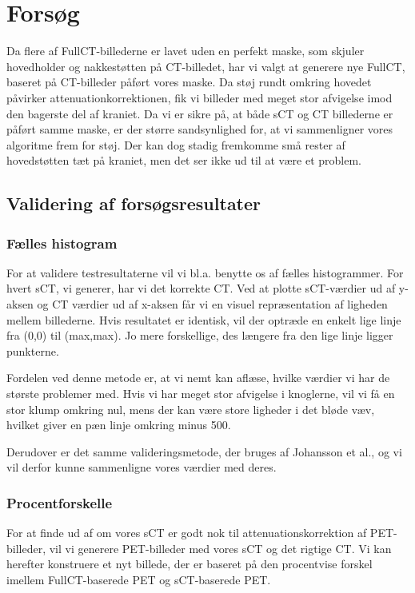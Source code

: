 \section{Forsøg}

Da flere af FullCT-billederne er lavet uden en perfekt maske, som skjuler hovedholder og nakkestøtten på CT-billedet, har vi valgt at generere nye FullCT, baseret på CT-billeder påført vores maske. Da støj rundt omkring hovedet påvirker attenuationkorrektionen, fik vi billeder med meget stor afvigelse imod den bagerste del af kraniet. Da vi er sikre på, at både sCT og CT billederne er påført samme maske, er der større sandsynlighed for, at vi sammenligner vores algoritme frem for støj. Der kan dog stadig fremkomme små rester af hovedstøtten tæt på kraniet, men det ser ikke ud til at være et problem.

\subsection{Validering af forsøgsresultater}

\subsubsection{Fælles histogram}

For at validere testresultaterne vil vi bl.a. benytte os af fælles histogrammer. For hvert sCT, vi generer, har vi det korrekte CT. Ved at plotte sCT-værdier ud af y-aksen og CT værdier ud af x-aksen får vi en visuel repræsentation af ligheden mellem billederne. Hvis resultatet er identisk, vil der optræde en enkelt lige linje fra (0,0) til (max,max). Jo mere forskellige, des længere fra den lige linje ligger punkterne.

Fordelen ved denne metode er, at vi nemt kan aflæse, hvilke værdier vi har de største problemer med. Hvis vi har meget stor afvigelse i knoglerne, vil vi få en stor klump omkring nul, mens der kan være store ligheder i det bløde væv, hvilket giver en pæn linje omkring minus 500.

Derudover er det samme valideringsmetode, der bruges af Johansson et al., og vi vil derfor kunne sammenligne vores værdier med deres.

\subsubsection{Procentforskelle}

For at finde ud af om vores sCT er godt nok til attenuationskorrektion af PET-billeder, vil vi generere PET-billeder med vores sCT og det rigtige CT. Vi kan herefter konstruere et nyt billede, der er baseret på den procentvise forskel imellem FullCT-baserede PET og sCT-baserede PET. 

